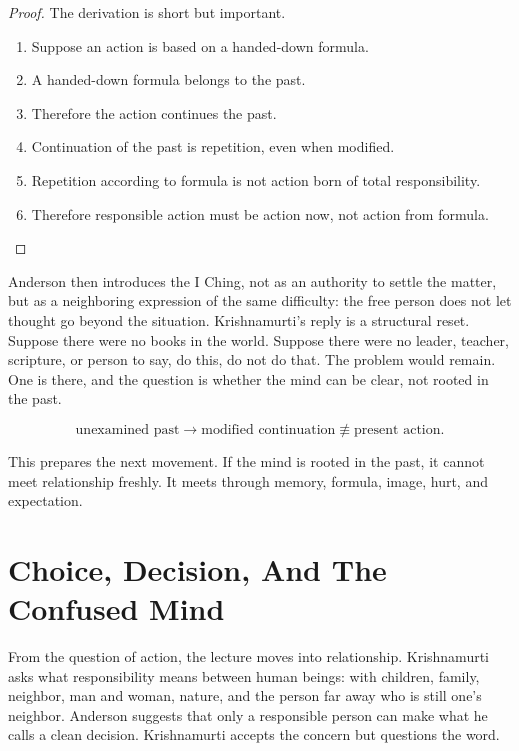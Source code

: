 \begin{proof}
The derivation is short but important.
\begin{enumerate}
\item Suppose an action is based on a handed-down formula.
\item A handed-down formula belongs to the past.
\item Therefore the action continues the past.
\item Continuation of the past is repetition, even when modified.
\item Repetition according to formula is not action born of total responsibility.
\item Therefore responsible action must be action now, not action from formula.
\end{enumerate}
\end{proof}

Anderson then introduces the I Ching, not as an authority to settle the matter, but as a neighboring expression of the same difficulty: the free person does not let thought go beyond the situation. Krishnamurti's reply is a structural reset. Suppose there were no books in the world. Suppose there were no leader, teacher, scripture, or person to say, do this, do not do that. The problem would remain. One is there, and the question is whether the mind can be clear, not rooted in the past.

\begin{equation}
\text{unexamined past}
\longrightarrow
\text{modified continuation}
\not\equiv
\text{present action}.
\end{equation}

This prepares the next movement. If the mind is rooted in the past, it cannot meet relationship freshly. It meets through memory, formula, image, hurt, and expectation.

\section{Choice, Decision, And The Confused Mind}

From the question of action, the lecture moves into relationship. Krishnamurti asks what responsibility means between human beings: with children, family, neighbor, man and woman, nature, and the person far away who is still one's neighbor. Anderson suggests that only a responsible person can make what he calls a clean decision. Krishnamurti accepts the concern but questions the word.

